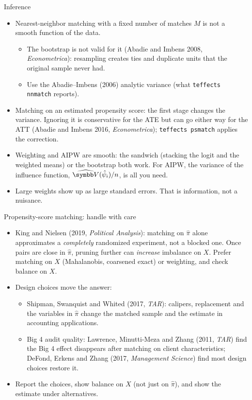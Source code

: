 \documentclass[aspectratio=169,11pt]{beamer}
\begin{document}
\begin{frame}{Inference}
\begin{itemize}
\item \alert{Nearest-neighbor matching} with a fixed number of matches $M$ is not a smooth function of the data.
\begin{itemize}
\item The bootstrap is \alert{not valid} for it (Abadie and Imbens 2008, \emph{Econometrica}): resampling creates
ties and duplicate units that the original sample never had.
\item Use the Abadie--Imbens (2006) analytic variance (what \texttt{teffects nnmatch} reports).
\end{itemize}
\medskip
\item \alert{Matching on an estimated propensity score}: the first stage changes the variance. Ignoring it is
conservative for the ATE but can go either way for the ATT (Abadie and Imbens 2016, \emph{Econometrica});
\texttt{teffects psmatch} applies the correction.
\medskip
\item \alert{Weighting and AIPW} are smooth: the sandwich (stacking the logit and the weighted means) or the bootstrap
both work. For AIPW, the variance of the influence function, $\widehat{\Var}(\hat\psi_i)/n$, is all you need.
\medskip
\item Large weights show up as large standard errors. That is information, not a nuisance.
\end{itemize}
\end{frame}


\begin{frame}{Propensity-score matching: handle with care}
\begin{itemize}
\item King and Nielsen (2019, \emph{Political Analysis}): matching on $\hat\pi$ alone approximates a \emph{completely}
randomized experiment, not a blocked one. Once pairs are close in $\hat\pi$, pruning further can \emph{increase}
imbalance on $X$. Prefer matching on $X$ (Mahalanobis, coarsened exact) or weighting, and check balance on $X$.
\medskip
\item Design choices move the answer:
\begin{itemize}
\item Shipman, Swanquist and Whited (2017, \emph{TAR}): calipers, replacement and the variables in $\hat\pi$ change
the matched sample and the estimate in accounting applications.
\item Big 4 audit quality: Lawrence, Minutti-Meza and Zhang (2011, \emph{TAR}) find the Big 4 effect disappears after
matching on client characteristics; DeFond, Erkens and Zhang (2017, \emph{Management Science}) find most design
choices restore it.
\end{itemize}
\medskip
\item Report the choices, show balance on $X$ (not just on $\hat\pi$), and show the estimate under alternatives.
\end{itemize}
\end{frame}
\end{document}
